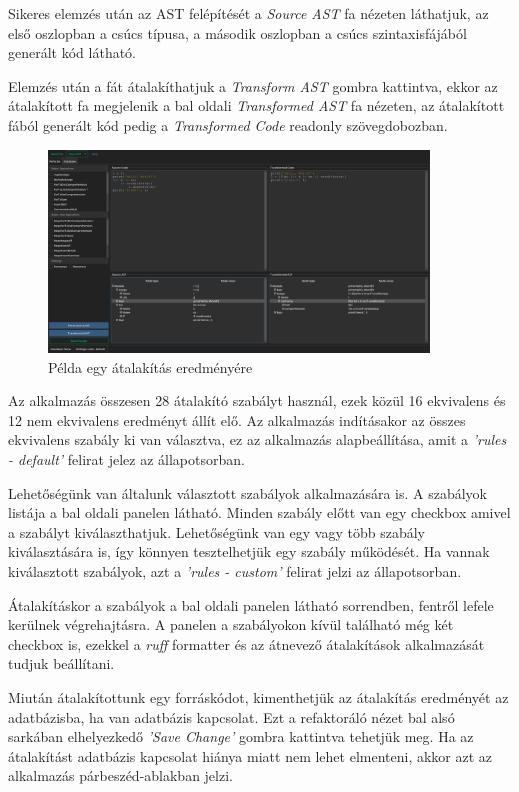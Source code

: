 Sikeres elemzés után az AST felépítését a \emph{Source AST} fa nézeten láthatjuk, 
az első oszlopban a csúcs típusa, a második oszlopban a csúcs szintaxisfájából
generált kód látható. 

Elemzés után a fát átalakíthatjuk a \emph{Transform AST} gombra kattintva, 
ekkor az átalakított fa megjelenik a bal oldali \emph{Transformed AST} fa nézeten,
az átalakított fából generált kód pedig a \emph{Transformed Code} readonly szövegdobozban.

\begin{figure}[H]
	\centering
	\includegraphics[width=0.9\textwidth]{images/screenshots/refactor_tab_2.png}
	\caption{Példa egy átalakítás eredményére}
\end{figure}

Az alkalmazás összesen 28 átalakító szabályt használ, ezek közül 16 ekvivalens és 12 nem ekvivalens
eredményt állít elő.
Az alkalmazás indításakor az összes ekvivalens szabály ki van választva,
ez az alkalmazás alapbeállítása, amit a \emph{'rules - default'} felirat jelez az állapotsorban.

Lehetőségünk van általunk választott szabályok alkalmazására is.
A szabályok listája a bal oldali panelen látható. Minden szabály előtt van egy checkbox
amivel a szabályt kiválaszthatjuk. Lehetőségünk van egy vagy több szabály kiválasztására is,
így könnyen tesztelhetjük egy szabály működését.
Ha vannak kiválasztott szabályok, azt a \emph{'rules - custom'} felirat jelzi az állapotsorban.

Átalakításkor a szabályok a bal oldali panelen látható sorrendben, fentről lefele kerülnek végrehajtásra.
A panelen a szabályokon kívül található még két checkbox is,
ezekkel a \emph{ruff} formatter és az átnevező átalakítások alkalmazását tudjuk beállítani.

Miután átalakítottunk egy forráskódot, kimenthetjük az átalakítás eredményét az adatbázisba,
ha van adatbázis kapcsolat.
Ezt a refaktoráló nézet bal alsó sarkában elhelyezkedő \emph{'Save Change'} gombra kattintva
tehetjük meg.
Ha az átalakítást adatbázis kapcsolat hiánya miatt nem lehet elmenteni,
akkor azt az alkalmazás párbeszéd-ablakban jelzi.

